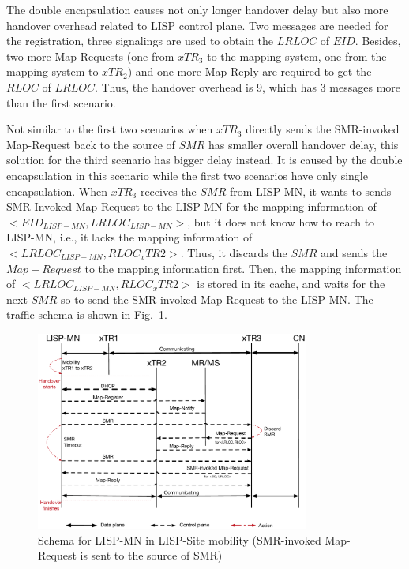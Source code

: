 The double encapsulation causes not only longer handover delay but also more handover overhead related to LISP control plane. Two messages are needed for the registration, three signalings are used to obtain the $LRLOC$ of $EID$. Besides, two more Map-Requests (one from $xTR_3$ to the mapping system, one from the mapping system to $xTR_2$) and one more Map-Reply are required to get the $RLOC$ of $LRLOC$. Thus, the handover overhead is 9, which has 3 messages more than the first scenario.

Not similar to the first two scenarios when $xTR_3$ directly sends the SMR-invoked Map-Request back to the source of $SMR$ has smaller overall handover delay, this solution for the third scenario has bigger delay instead. It is caused by the double encapsulation in this scenario while the first two scenarios have only single encapsulation. When $xTR_3$ receives the $SMR$ from LISP-MN, it wants to sends SMR-Invoked Map-Request to the LISP-MN for the mapping information of $<EID_{LISP-MN}, LRLOC_{LISP-MN}>$, but it does not know how to reach to LISP-MN, i.e., it lacks the mapping information of $<LRLOC_{LISP-MN}, RLOC_xTR2>$. Thus, it discards the $SMR$ and sends the $Map-Request$ to the mapping information first. Then, the mapping information of $<LRLOC_{LISP-MN}, RLOC_xTR2>$ is stored in its cache, and waits for the next $SMR$ so to send the SMR-invoked Map-Request to the LISP-MN. The traffic schema is shown in Fig.~\ref{Mobility_double_encap_schema_SMR_askxTR_simplify}.
\begin{figure}[!th]
	\centering
	\includegraphics[width=0.8\textwidth]{Pics/Mobility_double_encap_schema_SMR_askxTR_simplify}
	\caption{Schema for LISP-MN in LISP-Site mobility (SMR-invoked Map-Request is sent to the source of SMR)}
	\label{Mobility_double_encap_schema_SMR_askxTR_simplify}
\end{figure}

